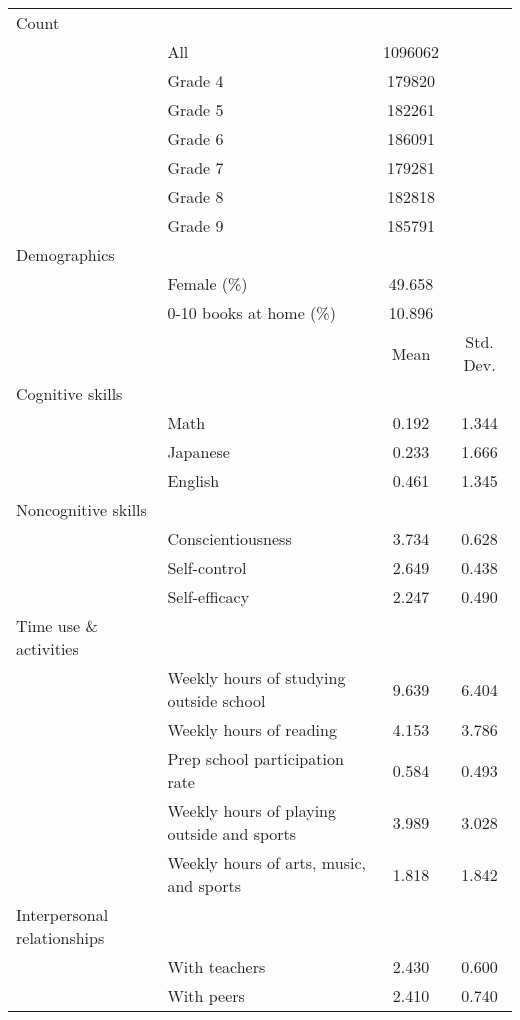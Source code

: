 \begin{tabular}{llcc}
\hline \hline 
Count &  &  &  \\
 & All & 1096062 &  \\
 & Grade 4 & 179820 &  \\
 & Grade 5 & 182261 &  \\
 & Grade 6 & 186091 &  \\
 & Grade 7 & 179281 &  \\
 & Grade 8 & 182818 &  \\
 & Grade 9 & 185791 &  \\
Demographics &  &  &  \\
 & Female  (\%) & 49.658 &  \\
 & 0-10 books at home  (\%) & 10.896 &  \\
\hline 
 &  & Mean & Std. Dev. \\
Cognitive skills &  &  &  \\
 & Math & 0.192 & 1.344 \\
 & Japanese & 0.233 & 1.666 \\
 & English & 0.461 & 1.345 \\
Noncognitive skills &  &  &  \\
 & Conscientiousness & 3.734 & 0.628 \\
 & Self-control & 2.649 & 0.438 \\
 & Self-efficacy & 2.247 & 0.490 \\
Time use \& activities &  &  &  \\
 & Weekly hours of studying outside school & 9.639 & 6.404 \\
 & Weekly hours of reading & 4.153 & 3.786 \\
 & Prep school participation rate & 0.584 & 0.493 \\
 & Weekly hours of playing outside and sports & 3.989 & 3.028 \\
 & Weekly hours of arts, music, and sports & 1.818 & 1.842 \\
Interpersonal relationships &  &  &  \\
 & With teachers & 2.430 & 0.600 \\
 & With peers & 2.410 & 0.740 \\
\hline \hline 
\end{tabular}